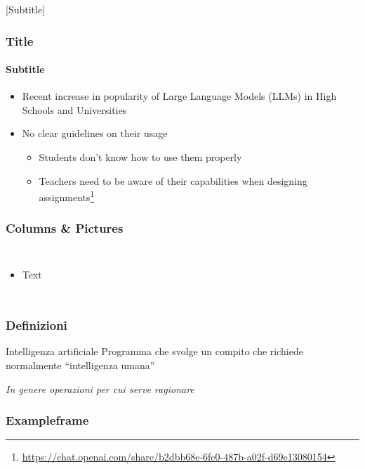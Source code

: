 [Subtitle]

\begin{contentframe}
    \frametitle{Title}
    \framesubtitle{Subtitle}

    \begin{itemize}
        \item Recent increase in popularity of Large Language Models (LLMs) in High Schools and Universities

        \bigskip
        \item No clear guidelines on their usage
        \begin{itemize}
            \item Students don't know how to use them properly
            \item Teachers need to be aware of their capabilities when designing assignments\footnote{\url{https://chat.openai.com/share/b2dbb68e-6fc0-487b-a02f-d69e13080154}}\cite{geng2023can, ouh2023chatgpt}
        \end{itemize}
    \end{itemize}
\end{contentframe}

\begin{contentframe}
    \frametitle{Columns \& Pictures}

    \begin{columns}
        \begin{itemize}
            \item Text
        \end{itemize}

        \centering
    \end{columns}
\end{contentframe}

\begin{contentframe}
    \frametitle{Definizioni}

    \begin{block}{Intelligenza artificiale}
        Programma che svolge un compito che richiede normalmente ``intelligenza umana''

        \small\textit{In genere operazioni per cui serve ragionare}
    \end{block}
\end{contentframe}

\begin{exampleframe}
    \frametitle{Exampleframe}
\end{exampleframe}

